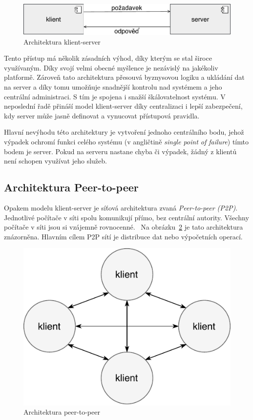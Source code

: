 \begin{figure}[t]
    \centering
    \includegraphics[keepaspectratio=true, width=0.6\linewidth]{figures/client-server.pdf}
    \caption{Architektura klient-server}
    \label{fig:client-server}
\end{figure}

Tento přístup má několik zásadních výhod, díky kterým se stal
široce využívaným. Díky svojí velmi obecné myšlence je nezávislý
na jakékoliv platformě.
Zároveň tato architektura přesouvá byznysovou logiku a
ukládání dat na server a díky tomu umožňuje
snadnější kontrolu nad systémem a jeho centrální administraci. S tím
je spojena i snažší škálovatelnost systému. V neposlední řadě
přináší model klient-server díky centralizaci i lepší zabezpečení,
kdy server může jasně definovat a vynucovat přístupová pravidla.

Hlavní nevýhodu této architektury je vytvoření jednoho centrálního bodu,
jehož výpadek ochromí funkci celého systému (v angličtině
\textit{single point of failure}) \textendash\xspace tímto bodem je server.
Pokud na serveru nastane chyba či výpadek, žádný z klientů není schopen využívat
jeho služeb.

\subsection{Architektura Peer-to-peer}\label{sec:p2p}

Opakem modelu klient-server je síťová architektura zvaná \textit{Peer-to-peer (\gls{P2P})}.
Jednotlivé počítače v síti spolu komunikují přímo, bez centrální autority.
Všechny počítače v síti jsou si vzájemně rovnocenné.~\cite{fox2001peer}
Na obrázku~\ref{fig:peer-to-peer} je tato architektura znázorněna.
Hlavním cílem \gls{P2P} sítí je distribuce dat nebo výpočetních operací.

\begin{figure}[t]
    \centering
    \includegraphics[keepaspectratio=true, width=0.4\linewidth]{figures/peer-to-peer.pdf}
    \caption{Architektura peer-to-peer}
    \label{fig:peer-to-peer}
\end{figure}

